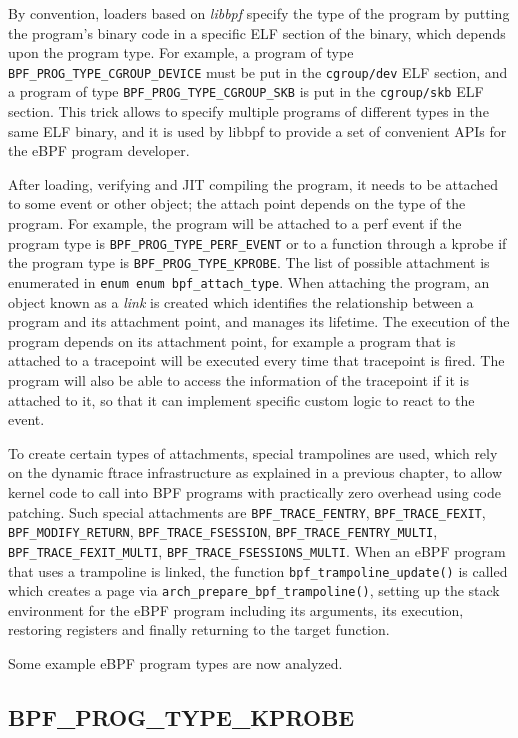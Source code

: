 By convention, loaders based on \textit{libbpf} specify the type of the program
by putting the program's binary code in a specific ELF section of the binary,
which depends upon the program type. For example, a program of type
\verb|BPF_PROG_TYPE_CGROUP_DEVICE| must be put in the \verb|cgroup/dev| ELF
section, and a program of type \verb|BPF_PROG_TYPE_CGROUP_SKB| is put in the
\verb|cgroup/skb| ELF section. This trick allows to specify multiple programs of
different types in the same ELF binary, and it is used by libbpf to provide a
set of convenient APIs for the eBPF program developer.

After loading, verifying and JIT compiling the program, it needs to be attached
to some event or other object; the attach point depends on the type of the
program. For example, the program will be attached to a perf event if the
program type is \verb|BPF_PROG_TYPE_PERF_EVENT| or to a function through a
kprobe if the program type is \verb|BPF_PROG_TYPE_KPROBE|. The list of possible
attachment is enumerated in \verb|enum enum bpf_attach_type|. When attaching the
program, an object known as a \textit{link} is created which identifies the
relationship between a program and its attachment point, and manages its
lifetime. The execution of the program depends on its attachment point, for
example a program that is attached to a tracepoint will be executed every time
that tracepoint is fired. The program will also be able to access the
information of the tracepoint if it is attached to it, so that it can implement
specific custom logic to react to the event.

To create certain types of attachments, special trampolines are used, which rely
on the dynamic ftrace infrastructure as explained in a previous chapter, to
allow kernel code to call into BPF programs with practically zero overhead using
code patching. Such special attachments are \verb|BPF_TRACE_FENTRY|,
\verb|BPF_TRACE_FEXIT|, \verb|BPF_MODIFY_RETURN|, \verb|BPF_TRACE_FSESSION|,
\verb|BPF_TRACE_FENTRY_MULTI|, \verb|BPF_TRACE_FEXIT_MULTI|,
\verb|BPF_TRACE_FSESSIONS_MULTI|. When an eBPF program that uses a trampoline is
linked, the function \verb|bpf_trampoline_update()| is called which creates a
page via \verb|arch_prepare_bpf_trampoline()|, setting up the stack environment
for the eBPF program including its arguments, its execution, restoring registers
and finally returning to the target function.

Some example eBPF program types are now analyzed.

\subsection*{BPF\_PROG\_TYPE\_KPROBE}

